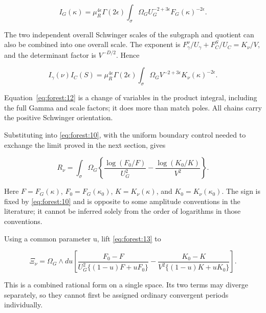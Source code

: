 \documentclass[11pt,a4paper,oneside]{article}
\theoremstyle{plain}
\theoremstyle{definition}
\theoremstyle{remark}
\numberwithin{equation}{section}
\begin{document}
\begin{equation}
I_G(\kappa)=\mu_R^{4\epsilon}\Gamma(2\epsilon)
             \int_\sigma \Omega_G
                  U_G^{-2+3\epsilon}F_G(\kappa)^{-2\epsilon}.    \label{eq:forest:11}
\end{equation}

The two independent overall Schwinger scales of the subgraph and quotient can also be combined into one overall scale. The exponent is \(F_\gamma ^\nu/U_\gamma +F_C^S/U_C=K_\nu /V\), and the determinant factor is \(V^{-D/2}\). Hence

\begin{equation}
I_\gamma(\nu)I_C(S)=\mu_R^{4\epsilon}\Gamma(2\epsilon)
             \int_\sigma\Omega_G V^{-2+3\epsilon}
                                      K_\nu(\kappa)^{-2\epsilon}.          \label{eq:forest:12}
\end{equation}

Equation~\eqref{eq:forest:12} is a change of variables in the product integral, including the full Gamma and scale factors; it does more than match poles. All chains carry the positive Schwinger orientation.

Substituting into \eqref{eq:forest:10}, with the uniform boundary control needed to exchange the limit proved in the next section, gives

\begin{equation}
R_\nu=\int_\sigma\Omega_G
 \left\{\frac{\log(F_0/F)}{U_G^2}
      -\frac{\log(K_0/K)}{V^2}\right\}.                         \label{eq:forest:13}
\end{equation}

Here \(F=F_G(\kappa )\), \(F_0=F_G(\kappa _0)\), \(K=K_\nu (\kappa )\), and \(K_0=K_\nu (\kappa _0)\). The sign is fixed by \eqref{eq:forest:10} and is opposite to some amplitude conventions in the literature; it cannot be inferred solely from the order of logarithms in those conventions.

Using a common parameter u, lift \eqref{eq:forest:13} to

\begin{equation}
\Xi_\nu=\Omega_G\wedge du\left[
 \frac{F_0-F}{U_G^2\{(1-u)F+uF_0\}}
 -
 \frac{K_0-K}{V^2\{(1-u)K+uK_0\}}\right].                       \label{eq:forest:14}
\end{equation}

This is a combined rational form on a single space. Its two terms may diverge separately, so they cannot first be assigned ordinary convergent periods individually.
\end{document}
